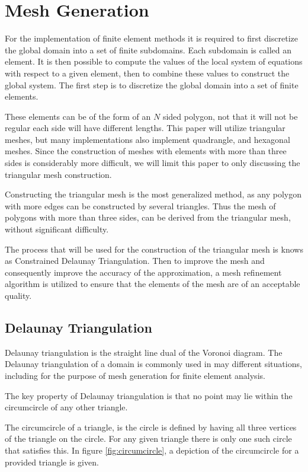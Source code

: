 \documentclass[../fem.tex]{subfile}
\begin{document}
\section{Mesh Generation}%
\label{sec:mesh_generation}

For the implementation of finite element methods it is required to first
discretize the global domain into a set of finite subdomains. Each subdomain is
called an element. It is then possible to compute the values of the local
system of equations with respect to a given element, then to combine these
values to construct the global system. The first step is to discretize the
global domain into a set of finite elements.

These elements can be of the form of an $N$ sided polygon, not that it will not
be regular each side will have different lengths. This paper will utilize
triangular meshes, but many implementations also implement quadrangle, and
hexagonal meshes. Since the construction of meshes with elements with more than
three sides is considerably more difficult, we will limit this paper to only
discussing the triangular mesh construction.

Constructing the triangular mesh is the most generalized method, as any polygon
with more edges can be constructed by several triangles. Thus the mesh of
polygons with more than three sides, can be derived from the triangular mesh,
without significant difficulty.

The process that will be used for the construction of the triangular mesh is
knows as Constrained Delaunay Triangulation. Then to improve the mesh and
consequently improve the accuracy of the approximation, a mesh refinement
algorithm is utilized to ensure that the elements of the mesh are of an
acceptable quality.

\subsection{Delaunay Triangulation}%
\label{sub:delaunay_triangulation}

Delaunay triangulation is the straight line dual of the Voronoi diagram. The
Delaunay triangulation of a domain is commonly used in may different
situations, including for the purpose of mesh generation for finite element
analysis.

The key property of Delaunay triangulation is that no point may lie within the
circumcircle of any other triangle.

\begin{definition}[Circumcircle]
  The circumcircle of a triangle, is the circle is defined by having all three
  vertices of the triangle on the circle. For any given triangle there is only
  one such circle that satisfies this. In figure \ref{fig:circumcircle}, a
  depiction of the circumcircle for a provided triangle is given.
\end{definition}
\end{document}
